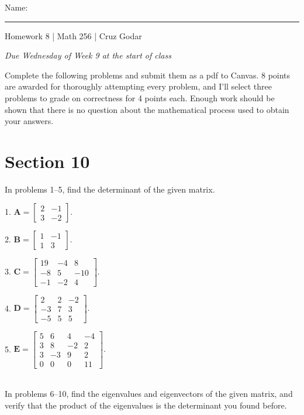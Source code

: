 \documentclass{article}
\begin{document}
\Large Name: \rule{2in}{0.15mm} \hfill Homework 8 | Math 256 | Cruz Godar \vspace{4pt}  \normalsize

\textit{Due Wednesday of Week 9 at the start of class}

Complete the following problems and submit them as a pdf to Canvas. 8 points are awarded for thoroughly attempting every problem, and I'll select three problems to grade on correctness for 4 points each. Enough work should be shown that there is no question about the mathematical process used to obtain your answers.

\section{Section 10}

In problems 1--5, find the determinant of the given matrix.

1. $\displaystyle \mathbf{A} = \left[\begin{array}{cc}2& -1 \\ 3& -2\end{array}\right].$

2. $\displaystyle \mathbf{B} = \left[\begin{array}{cc}1& -1 \\ 1& 3\end{array}\right].$

3. $\displaystyle \mathbf{C} = \left[\begin{array}{ccc}19& -4& 8 \\ -8& 5& -10 \\ -1& -2& 4\end{array}\right].$

4. $\displaystyle \mathbf{D} = \left[\begin{array}{ccc}2& 2& -2 \\ -3& 7& 3 \\ -5& 5& 5\end{array}\right].$

5. $\displaystyle \mathbf{E} = \left[\begin{array}{cccc}5& 6& 4& -4 \\ 3& 8& -2& 2 \\ 3& -3& 9& 2 \\ 0& 0& 0& 11\end{array}\right].$

~\\

In problems 6--10, find the eigenvalues and eigenvectors of the given matrix, and verify that the product of the eigenvalues is the determinant you found before.
\end{document}
